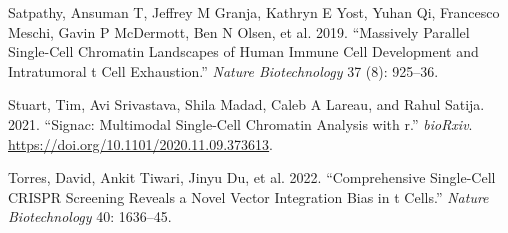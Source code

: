\documentclass[
]{article}
\newlength{\cslhangindent}
\newenvironment{CSLReferences}[2] %
 {\begin{list}{}{%
  \setlength{\itemindent}{0pt}
  \setlength{\leftmargin}{0pt}
  \setlength{\parsep}{0pt}
  \ifodd #1
   \setlength{\leftmargin}{\cslhangindent}
   \setlength{\itemindent}{-1\cslhangindent}
  \fi
  \setlength{\itemsep}{#2\baselineskip}}}
 {\end{list}}
\begin{document}
\begin{CSLReferences}{1}{0}
Satpathy, Ansuman T, Jeffrey M Granja, Kathryn E Yost, Yuhan Qi,
Francesco Meschi, Gavin P McDermott, Ben N Olsen, et al. 2019.
{``Massively Parallel Single-Cell Chromatin Landscapes of Human Immune
Cell Development and Intratumoral t Cell Exhaustion.''} \emph{Nature
Biotechnology} 37 (8): 925--36.

Stuart, Tim, Avi Srivastava, Shila Madad, Caleb A Lareau, and Rahul
Satija. 2021. {``Signac: Multimodal Single-Cell Chromatin Analysis with
r.''} \emph{bioRxiv}. \url{https://doi.org/10.1101/2020.11.09.373613}.

Torres, David, Ankit Tiwari, Jinyu Du, et al. 2022. {``Comprehensive
Single-Cell CRISPR Screening Reveals a Novel Vector Integration Bias in
t Cells.''} \emph{Nature Biotechnology} 40: 1636--45.

\end{CSLReferences}
\end{document}
